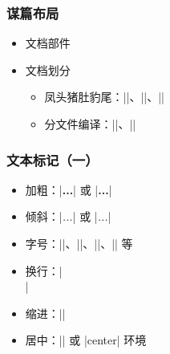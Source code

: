 \begin{frame}[fragile]
\frametitle{谋篇布局}
\begin{itemize}
  \item 文档部件


  \item 文档划分

    \begin{itemize}
      \item 凤头猪肚豹尾：|\frontmatter|、|\mainmatter|、|\backmatter|
      \item 分文件编译：||、||
    \end{itemize}
\end{itemize}
\end{frame}

\begin{frame}[fragile]
\frametitle{文本标记（一）}
\begin{itemize}
  \item 加粗：|{\bfseries ...}| 或 |\textbf{...}|
  \item 倾斜：|{\itshape ...}| 或 |\textit{...}|
  \item 字号：|\tiny|、|\small|、|\large|、|\Large| 等
  \item 换行：|\\|
  \item 缩进：|\indent|
  \item 居中：|\centering| 或 |center| 环境
\end{itemize}
\end{frame}


